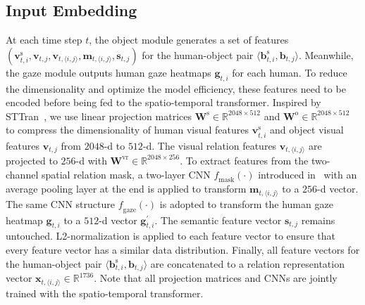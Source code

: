 \documentclass[times,twocolumn,final,authoryear]{elsarticle}
\begin{document}
\subsection{Input Embedding}
At each time step $t$, the object module generates a set of features $(\mathbf{v}_{t,i}^\text{s}, \mathbf{v}_{t,j}, \mathbf{v}_{t,\langle i,j \rangle}, \mathbf{m}_{t,\langle i,j \rangle}, \mathbf{s}_{t,j})$ for the human-object pair $\langle \mathbf{b}_{t,i}^\text{s}, \mathbf{b}_{t,j} \rangle$. Meanwhile, the gaze module outputs human gaze heatmaps $\mathbf{g}_{t,i}$ for each human. To reduce the dimensionality and optimize the model efficiency, these features need to be encoded before being fed to the spatio-temporal transformer. Inspired by STTran~\citep{hoi_v2:sttran}, we use linear projection matrices $\mathbf{W}^\text{s} \in \mathbb{R}^{2048 \times 512}$ and $\mathbf{W}^\text{o} \in \mathbb{R}^{2048 \times 512}$ to compress the dimensionality of human visual features $\mathbf{v}_{t,i}^\text{s}$ and object visual features $\mathbf{v}_{t,j}$ from $2048$-d to $512$-d. The visual relation features $\mathbf{v}_{t,\langle i,j \rangle}$ are projected to $256$-d with $\mathbf{W}^\text{vr} \in \mathbb{R}^{2048 \times 256}$. To extract features from the two-channel spatial relation mask, a two-layer CNN $\mathit{f}_\text{mask}(\cdot)$ introduced in~\citep{hoi_i2:neural_motifs} with an average pooling layer at the end is applied to transform  $\mathbf{m}_{t,\langle i,j \rangle}$ to a $256$-d vector. The same CNN structure $\mathit{f}_\text{gaze}(\cdot)$ is adopted to transform the human gaze heatmap $\mathbf{g}_{t,i}$ to a $512$-d vector $\mathbf{g}^\prime_{t,i}$. The semantic feature vector $\mathbf{s}_{t,j}$ remains untouched. L2-normalization is applied to each feature vector to ensure that every feature vector has a similar data distribution. Finally, all feature vectors for the human-object pair $\langle \mathbf{b}_{t,i}^\text{s}, \mathbf{b}_{t,j} \rangle$ are concatenated to a relation representation vector $\mathbf{x}_{t,\langle i,j \rangle} \in \mathbb{R}^{1736}$. Note that all projection matrices and CNNs are jointly trained with the spatio-temporal transformer. 
\end{document}
